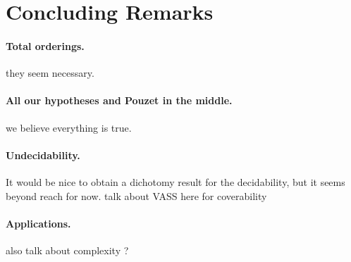 %
\section{Concluding Remarks}
\label{sec:conclusion}


\paragraph*{Total orderings.} they seem necessary.

\paragraph*{All our hypotheses and Pouzet in the middle.} we believe everything
is true.

\paragraph*{Undecidability.} It would be nice to obtain a dichotomy result
for the decidability, but it seems beyond reach for now.
talk about VASS here  for coverability

\paragraph*{Applications.} also talk about complexity ?
